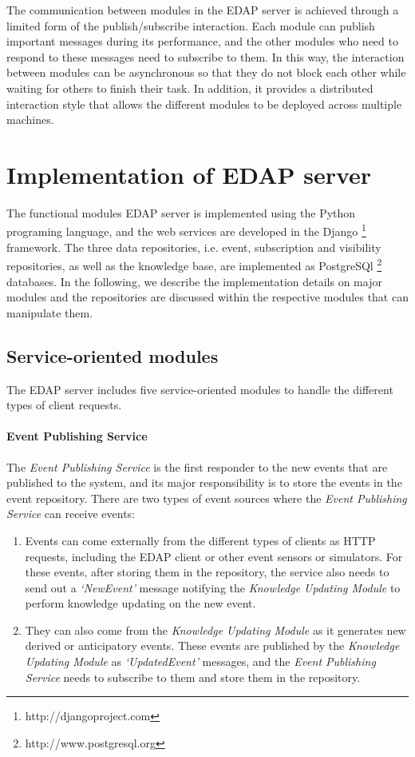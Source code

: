 The communication between modules in the EDAP server is achieved through a limited form of the publish/subscribe interaction. Each module can publish important messages during its performance, and the other modules who need to respond to these messages need to subscribe to them. In this way, the interaction between modules can be asynchronous so that they do not block each other while waiting for others to finish their task. In addition, it provides a distributed interaction style that allows the different modules to be deployed across multiple machines. 

\section{Implementation of EDAP server} %
\label{sec:implementation_of_edap_server}
The functional modules EDAP server is implemented using the Python programing language, and the web services are developed in the Django \footnote{http://djangoproject.com} framework. The three data repositories, i.e. event, subscription and visibility repositories, as well as the knowledge base, are implemented as PostgreSQl \footnote{http://www.postgresql.org} databases. In the following, we describe the implementation details on major modules and the repositories are discussed within the respective modules that can manipulate them. 

\subsection{Service-oriented modules} %
\label{sub:service_oriented_modules}
The EDAP server includes five service-oriented modules to handle the different types of client requests. 

\paragraph*{Event Publishing Service} %
\label{par:event_publishing_service}
The \emph{Event Publishing Service} is the first responder to the new events that are published to the system, and its major responsibility is to store the events in the event repository. There are two types of event sources where the \emph{Event Publishing Service} can receive events:

\begin{enumerate}
	\item Events can come externally from the different types of clients as HTTP requests, including the EDAP client or other event sensors or simulators. For these events, after storing them in the repository, the service also needs to send out a \emph{`NewEvent'} message notifying the \emph{Knowledge Updating Module} to perform knowledge updating on the new event.
	\item They can also come from the \emph{Knowledge Updating Module} as it generates new derived or anticipatory events. These events are published by the \emph{Knowledge Updating Module} as \emph{`UpdatedEvent'} messages, and the \emph{Event Publishing Service} needs to subscribe to them and store them in the repository. 
\end{enumerate}

